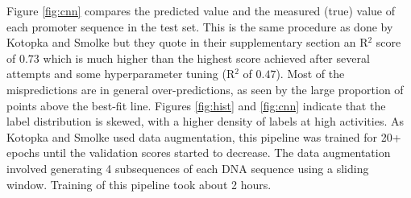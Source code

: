 \documentclass{article}
\begin{document}
Figure \ref{fig:cnn} compares the predicted value and the measured (true) value of each promoter sequence in the test set. This is the same procedure as done by Kotopka and Smolke \cite{smolke2020promoter} but they quote in their supplementary section an R$^2$ score of $0.73$ which is much higher than the highest score achieved after several attempts and some hyperparameter tuning (R$^2$ of $0.47$). Most of the mispredictions are in general over-predictions, as seen by the large proportion of points above the best-fit line. Figures \ref{fig:hist} and \ref{fig:cnn} indicate that the label distribution is skewed, with a higher density of labels at high activities. As Kotopka and Smolke \cite{smolke2020promoter} used data augmentation, this pipeline was trained for 20+ epochs until the validation scores started to decrease. The data augmentation involved generating 4 subsequences of each DNA sequence using a sliding window. Training of this pipeline took about 2 hours.
\end{document}
